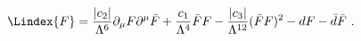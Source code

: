 \begin{equation}
  \label{eq:vyFlag3}
  \Lindex{F} = \frac{|c_2|}{\Lambda^6} \partial_\mu F \partial^\mu \bar{F} +
  \frac{c_1}{\Lambda^4} \bar{F} F  - \frac{|c_3|}{\Lambda^{12}} (\bar{F} F)^2 - d F - \bar{d} \bar{F}\ .
\end{equation}

